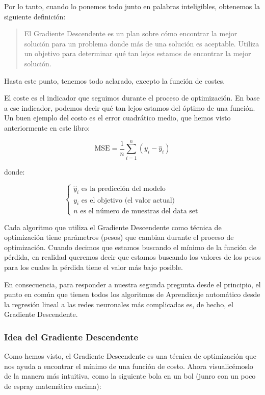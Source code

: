 \documentclass[
]{book}
\begin{document}
Por lo tanto, cuando lo ponemos todo junto en palabras inteligibles, obtenemos la siguiente definición:

\begin{quote}
El Gradiente Descendente es un plan sobre cómo encontrar la mejor solución para un problema donde más de una solución es aceptable. Utiliza un objetivo para determinar qué tan lejos estamos de encontrar la mejor solución.
\end{quote}

Hasta este punto, tenemos todo aclarado, excepto la función de costes.

El coste es el indicador que seguimos durante el proceso de optimización. En base a ese indicador, podemos decir qué tan lejos estamos del óptimo de una función. Un buen ejemplo del costo es el error cuadrático medio, que hemos visto anteriormente en este libro:

\[\textrm{MSE} = \frac{1}{n} \sum_{i=1}^n (y_i - \hat{y}_i)\]

donde:

\[    
\begin{cases}
        \textrm{$\hat{y}_i$ es la predicción del modelo} \\
        \textrm{$y_i$ es el objetivo (el valor actual)} \\
        \textrm{$n$ es el número de muestras del data set}
    \end{cases}
\]

Cada algoritmo que utiliza el Gradiente Descendente como técnica de optimización tiene parámetros (pesos) que cambian durante el proceso de optimización. Cuando decimos que estamos buscando el mínimo de la función de pérdida, en realidad queremos decir que estamos buscando los valores de los pesos para los cuales la pérdida tiene el valor más bajo posible.

En consecuencia, para responder a nuestra segunda pregunta desde el principio, el punto en común que tienen todos los algoritmos de Aprendizaje automático desde la regresión lineal a las redes neuronales más complicadas es, de hecho, el Gradiente Descendente.

\hypertarget{idea-del-gradiente-descendente}{%
\subsubsection{Idea del Gradiente Descendente}\label{idea-del-gradiente-descendente}}

Como hemos visto, el Gradiente Descendente es una técnica de optimización que nos ayuda a encontrar el mínimo de una función de costo. Ahora visualicémoslo de la manera más intuitiva, como la siguiente bola en un bol (junro con un poco de espray matemático encima):
\end{document}
